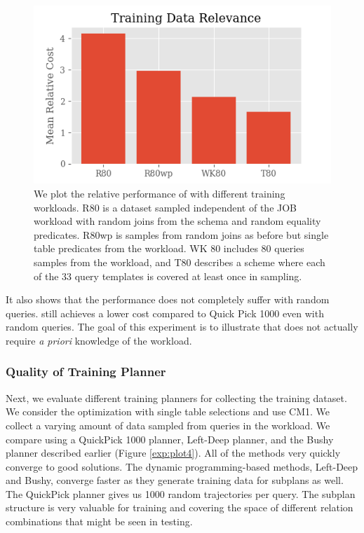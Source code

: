 \begin{figure}
    \centering
    \includegraphics[width=0.8\columnwidth]{exp/exp2_plot2.png}
    \caption{We plot the relative performance of \sys with different training workloads. R80 is a dataset sampled independent of the JOB workload with random joins from the schema and random equality predicates. R80wp is samples from random joins as before but single table predicates from the workload. WK 80 includes 80 queries samples from the workload, and T80 describes a scheme where each of the 33 query templates is covered at least once in sampling. \label{exp:plot3}}
\end{figure}

It also shows that the performance does not completely suffer with random queries. 
\sys still achieves a lower cost compared to Quick Pick 1000 even with random queries.
The goal of this experiment is to illustrate that \sys does not actually require \emph{a priori} knowledge of the workload.

\subsubsection{Quality of Training Planner}
Next, we evaluate different training planners for collecting the training dataset.  We consider the optimization with single table selections and use CM1. We collect a varying amount of data sampled from queries in the workload. We compare using a QuickPick 1000 planner, Left-Deep planner, and the Bushy planner described earlier (Figure \ref{exp:plot4}).  All of the methods very quickly converge to good solutions. The dynamic programming-based methods, Left-Deep and Bushy, converge faster as they generate training data for subplans as well. The QuickPick planner gives us 1000 random trajectories per query.
The subplan structure is very valuable for training and covering the space of different relation combinations that might be seen in testing.


